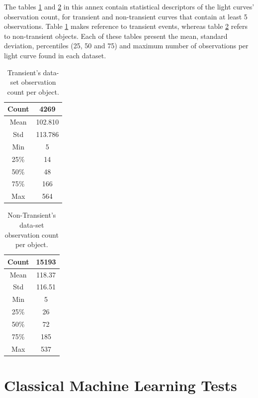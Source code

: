 \documentclass[a4paper,fleqn,usenatbib]{mnras}
\begin{document}
The tables \ref{Transient-Observation-Count} and \ref{Non-Transient-Observation-Count} in this annex contain statistical descriptors of the light curves' observation count, for transient and non-transient curves that contain at least 5 observations.
Table \ref{Transient-Observation-Count} makes reference to transient events, whereas table \ref{Non-Transient-Observation-Count} refers to non-transient objects. 
Each of these tables present the mean, standard deviation, percentiles (25, 50 and 75) and maximum number of observations per light curve found in each dataset.

\begin{table}
\centering
\begin{tabular}{c|c}
    \hline
    Count & 4269 \\
    \hline
    Mean & 102.810 \\
    Std & 113.786 \\
    Min & 5 \\
    25\% & 14 \\
    50\% & 48 \\
    75\% & 166 \\
    Max & 564 \\
    \hline
\end{tabular}
\caption{Transient's data-set observation count per object.}
\label{Transient-Observation-Count}
\end{table}

\begin{table}
\centering
\begin{tabular}{c|c}
    \hline
    Count & 15193 \\
    \hline
    Mean & 118.37 \\
    Std & 116.51 \\
    Min & 5 \\
    25\% & 26 \\
    50\% & 72 \\
    75\% & 185 \\
    Max & 537 \\
    \hline
\end{tabular}
\caption{Non-Transient's data-set observation count per object.}
\label{Non-Transient-Observation-Count}
\end{table}



\section{Classical Machine Learning Tests} \label{section_method}
\end{document}
